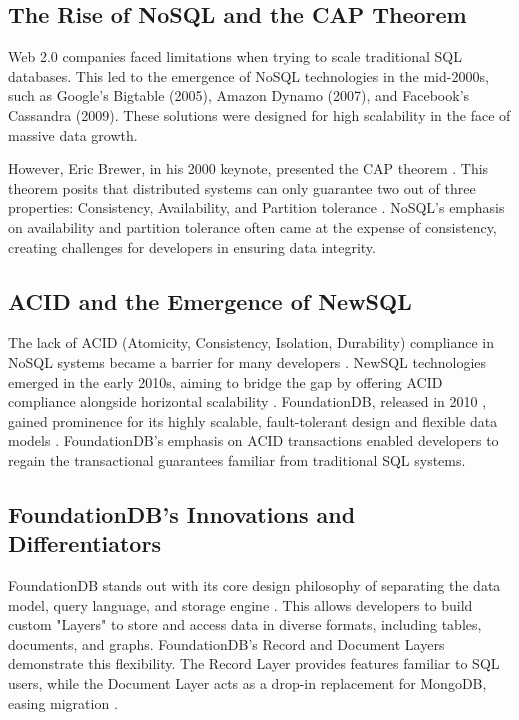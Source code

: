 \documentclass[sigconf]{acmart}
\begin{document}
\subsection{The Rise of NoSQL and the CAP Theorem}

Web 2.0 companies faced limitations when trying to scale traditional SQL databases. This led to the emergence of NoSQL technologies in the mid-2000s, such as Google's Bigtable (2005)\cite{BigTable}, Amazon Dynamo (2007)\cite{Dynamo}, and Facebook's Cassandra (2009)\cite{Cassandra}. These solutions were designed for high scalability in the face of massive data growth.

However, Eric Brewer, in his 2000 keynote, presented the CAP theorem \cite{Brewer,Browne_2009}. This theorem posits that distributed systems can only guarantee two out of three properties: Consistency, Availability, and Partition tolerance \cite{BrewerSupport}. NoSQL's emphasis on availability and partition tolerance often came at the expense of consistency, creating challenges for developers in ensuring data integrity.

\subsection{ACID and the Emergence of NewSQL}

The lack of ACID (Atomicity, Consistency, Isolation, Durability) compliance in NoSQL systems became a barrier for many developers \cite{NewSQL}. NewSQL technologies emerged in the early 2010s, aiming to bridge the gap by offering ACID compliance alongside horizontal scalability \cite{NewSQL}. FoundationDB, released in 2010 \cite{FoundationDBCreation}, gained prominence for its highly scalable, fault-tolerant design and flexible data models \cite{FoundationDBPaper,Snowflake}. FoundationDB's emphasis on ACID transactions enabled developers to regain the transactional guarantees familiar from traditional SQL systems.

\subsection{FoundationDB's Innovations and Differentiators}

FoundationDB stands out with its core design philosophy of separating the data model, query language, and storage engine \cite{FoundationDBPaper}. This allows developers to build custom "Layers" to store and access data in diverse formats, including tables, documents, and graphs. FoundationDB's Record and Document Layers demonstrate this flexibility. The Record Layer provides features familiar to SQL users, while the Document Layer acts as a drop-in replacement for MongoDB, easing migration \cite{FDBDocumentGithub}.
\end{document}
